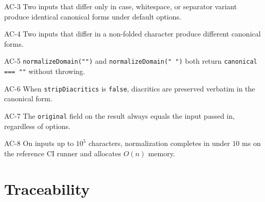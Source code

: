 \begin{ac}{AC-3}
Two inputs that differ only in case, whitespace, or separator variant produce identical canonical forms under default options.
\end{ac}

\begin{ac}{AC-4}
Two inputs that differ in a non-folded character produce different canonical forms.
\end{ac}

\begin{ac}{AC-5}
\texttt{normalizeDomain("")} and \texttt{normalizeDomain("   ")} both return \texttt{canonical === ""} without throwing.
\end{ac}

\begin{ac}{AC-6}
When \texttt{stripDiacritics} is \texttt{false}, diacritics are preserved verbatim in the canonical form.
\end{ac}

\begin{ac}{AC-7}
The \texttt{original} field on the result always equals the input passed in, regardless of options.
\end{ac}

\begin{ac}{AC-8}
On inputs up to \(10^{5}\) characters, normalization completes in under \(10\) ms on the reference CI runner and allocates \(O(n)\) memory.
\end{ac}

\section{Traceability}

